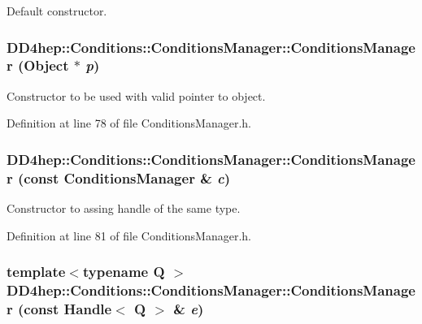Default constructor. \hypertarget{class_d_d4hep_1_1_conditions_1_1_conditions_manager_a01b34e91e804ce2dea5d8e363f924d29}{
\subsubsection[{ConditionsManager}]{\setlength{\rightskip}{0pt plus 5cm}DD4hep::Conditions::ConditionsManager::ConditionsManager ({\bf Object} $\ast$ {\em p})}}
\label{class_d_d4hep_1_1_conditions_1_1_conditions_manager_a01b34e91e804ce2dea5d8e363f924d29}


Constructor to be used with valid pointer to object. 

Definition at line 78 of file ConditionsManager.h.\hypertarget{class_d_d4hep_1_1_conditions_1_1_conditions_manager_a7ff6e3f2b2c93d5ac2245ce62ff5f34f}{
\subsubsection[{ConditionsManager}]{\setlength{\rightskip}{0pt plus 5cm}DD4hep::Conditions::ConditionsManager::ConditionsManager (const {\bf ConditionsManager} \& {\em c})}}
\label{class_d_d4hep_1_1_conditions_1_1_conditions_manager_a7ff6e3f2b2c93d5ac2245ce62ff5f34f}


Constructor to assing handle of the same type. 

Definition at line 81 of file ConditionsManager.h.\hypertarget{class_d_d4hep_1_1_conditions_1_1_conditions_manager_a36b71a071ec86983838c34bcaf215625}{
\subsubsection[{ConditionsManager}]{\setlength{\rightskip}{0pt plus 5cm}template$<$typename Q $>$ DD4hep::Conditions::ConditionsManager::ConditionsManager (const {\bf Handle}$<$ Q $>$ \& {\em e})}}
\label{class_d_d4hep_1_1_conditions_1_1_conditions_manager_a36b71a071ec86983838c34bcaf215625}


